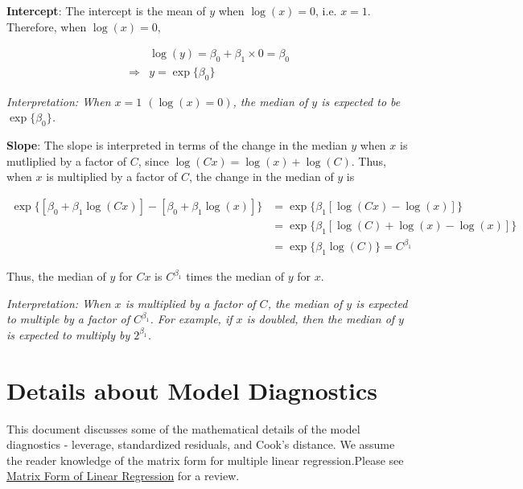 \documentclass[]{book}
\begin{document}
\textbf{Intercept}: The intercept is the mean of \(y\) when
\(\log(x) = 0\), i.e. \(x = 1\). Therefore, when \(\log(x) = 0\),

\begin{equation}
\begin{aligned}
&\log(y) = \beta_0 + \beta_1 \times 0 = \beta_0 \\[10pt]
\Rightarrow &y = \exp\{\beta_0\}
\end{aligned}
\end{equation}

\emph{Interpretation: When \(x = 1\) \((\log(x) = 0)\), the median of
\(y\) is expected to be \(\exp\{\beta_0\}\).}

\textbf{Slope}: The slope is interpreted in terms of the change in the
median \(y\) when \(x\) is mutliplied by a factor of \(C\), since
\(\log(Cx) = \log(x) + \log(C)\). Thus, when \(x\) is multiplied by a
factor of \(C\), the change in the median of \(y\) is

\begin{equation}
\begin{aligned}
\exp\{[\beta_0 + \beta_1 \log(Cx)] - [\beta_0 + \beta_1 \log(x)]\} &= 
\exp\{\beta_1 [\log(Cx) - \log(x)]\} \\[10pt] 
& = \exp\{\beta_1[\log(C) + \log(x) - \log(x)]\} \\[10pt] 
& = \exp\{\beta_1 \log(C)\} = C^{\beta_1}
\end{aligned}
\end{equation}

Thus, the median of \(y\) for \(Cx\) is \(C^{\beta_1}\) times the median
of \(y\) for \(x\).

\emph{Interpretation: When \(x\) is multiplied by a factor of \(C\), the
median of \(y\) is expected to multiple by a factor of \(C^{\beta_1}\).
For example, if \(x\) is doubled, then the median of \(y\) is expected
to multiply by \(2^{\beta_1}\).}

\chapter{Details about Model
Diagnostics}\label{details-about-model-diagnostics}

This document discusses some of the mathematical details of the model
diagnostics - leverage, standardized residuals, and Cook's distance. We
assume the reader knowledge of the matrix form for multiple linear
regression.Please see
\href{https://github.com/STA210-Sp19/supplemental-notes/blob/master/regression-basics-matrix.pdf}{Matrix
Form of Linear Regression} for a review.
\end{document}
